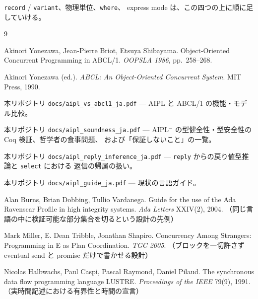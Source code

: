 \documentclass[11pt,a4paper]{ltjsarticle}
\theoremstyle{remark}
\begin{document}
\texttt{record} / \texttt{variant}、物理単位、\texttt{where}、
express mode は、この四つの上に順に足していける。


\begin{thebibliography}{9}

Akinori Yonezawa, Jean-Pierre Briot, Etsuya Shibayama.
\newblock Object-Oriented Concurrent Programming in ABCL/1.
\newblock \emph{OOPSLA 1986}, pp.~258--268.

Akinori Yonezawa (ed.).
\newblock \emph{ABCL: An Object-Oriented Concurrent System}. MIT Press, 1990.

本リポジトリ \texttt{docs/aipl\_vs\_abcl1\_ja.pdf} ---
  AIPL と ABCL/1 の機能・モデル比較。

本リポジトリ \texttt{docs/aipl\_soundness\_ja.pdf} ---
  AIPL$^-$ の型健全性・型安全性の Coq 検証、哲学者の食事問題、
  および「保証しないこと」の一覧。

本リポジトリ \texttt{docs/aipl\_reply\_inference\_ja.pdf} ---
  \texttt{reply} からの戻り値型推論と \texttt{select} における
  返信の帰属の扱い。

本リポジトリ \texttt{docs/aipl\_guide\_ja.pdf} --- 現状の言語ガイド。

Alan Burns, Brian Dobbing, Tullio Vardanega.
\newblock Guide for the use of the Ada Ravenscar Profile in high integrity
systems.
\newblock \emph{Ada Letters} XXIV(2), 2004.
\newblock （同じ言語の中に検証可能な部分集合を切るという設計の先例）

Mark Miller, E. Dean Tribble, Jonathan Shapiro.
\newblock Concurrency Among Strangers: Programming in E as Plan Coordination.
\newblock \emph{TGC 2005}.
\newblock （ブロックを一切許さず eventual send と promise だけで書かせる設計）

Nicolas Halbwachs, Paul Caspi, Pascal Raymond, Daniel Pilaud.
\newblock The synchronous data flow programming language LUSTRE.
\newblock \emph{Proceedings of the IEEE} 79(9), 1991.
\newblock （実時間記述における有界性と時間の宣言）

\end{thebibliography}
\end{document}
